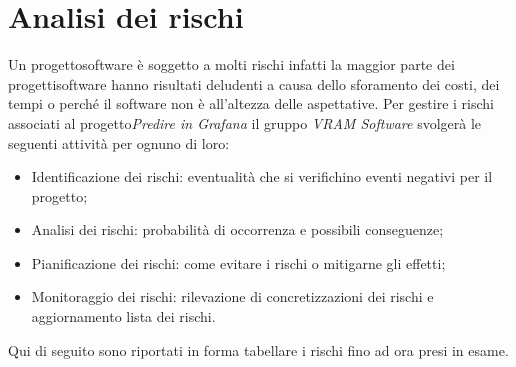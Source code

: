 \section{Analisi dei rischi}

Un progetto\glosp software è soggetto a molti rischi infatti la maggior parte dei progetti\glosp software hanno risultati deludenti a causa dello sforamento dei costi, dei tempi o perché il software non è all'altezza delle aspettative. Per gestire i rischi associati al progetto\glosp \textit{Predire in Grafana} il gruppo \textit{VRAM Software} svolgerà le seguenti attività per ognuno di loro:

\begin{itemize}
	\item Identificazione dei rischi: eventualità che si verifichino eventi negativi per il progetto\glo;
	\item Analisi dei rischi: probabilità di occorrenza e possibili conseguenze;
	\item Pianificazione dei rischi: come evitare i rischi o mitigarne gli effetti;
	\item Monitoraggio dei rischi: rilevazione di concretizzazioni dei rischi e aggiornamento lista dei rischi.
\end{itemize}

Qui di seguito sono riportati in forma tabellare i rischi fino ad ora presi in esame.
